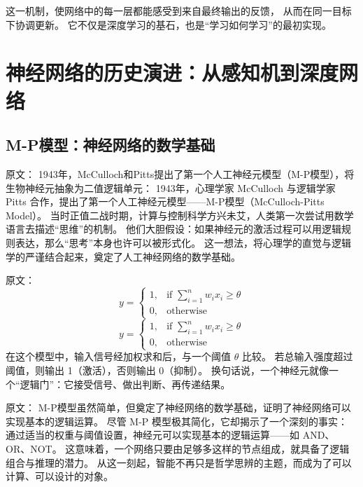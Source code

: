 这一机制，使网络中的每一层都能感受到来自最终输出的反馈，  
从而在同一目标下协调更新。  
它不仅是深度学习的基石，也是“学习如何学习”的最初实现。


\section{神经网络的历史演进：从感知机到深度网络}

\subsection{M-P模型：神经网络的数学基础}

原文：
1943年，McCulloch和Pitts提出了第一个人工神经元模型（M-P模型），将生物神经元抽象为二值逻辑单元：
1943年，心理学家 McCulloch 与逻辑学家 Pitts 合作，提出了第一个人工神经元模型——M-P模型（McCulloch-Pitts Model）。  
当时正值二战时期，计算与控制科学方兴未艾，人类第一次尝试用数学语言去描述“思维”的机制。  
他们大胆假设：如果神经元的激活过程可以用逻辑规则表达，那么“思考”本身也许可以被形式化。  
这一想法，将心理学的直觉与逻辑学的严谨结合起来，奠定了人工神经网络的数学基础。

原文：
\begin{equation}
y = \begin{cases}
1, & \text{if } \sum_{i=1}^{n} w_i x_i \geq \theta \\
0, & \text{otherwise}
\end{cases}
\end{equation}
\begin{equation}
y = 
\begin{cases}
1, & \text{if } \sum_{i=1}^{n} w_i x_i \geq \theta \\
0, & \text{otherwise}
\end{cases}
\end{equation}
在这个模型中，输入信号经加权求和后，与一个阈值 $\theta$ 比较。  
若总输入强度超过阈值，则输出 1（激活），否则输出 0（抑制）。  
换句话说，一个神经元就像一个“逻辑门”：它接受信号、做出判断、再传递结果。

原文：
M-P模型虽然简单，但奠定了神经网络的数学基础，证明了神经网络可以实现基本的逻辑运算。
尽管 M-P 模型极其简化，它却揭示了一个深刻的事实：  
通过适当的权重与阈值设置，神经元可以实现基本的逻辑运算——如 AND、OR、NOT。  
这意味着，一个网络只要由足够多这样的节点组成，就具备了逻辑组合与推理的潜力。  
从这一刻起，智能不再只是哲学思辨的主题，而成为了可以计算、可以设计的对象。



